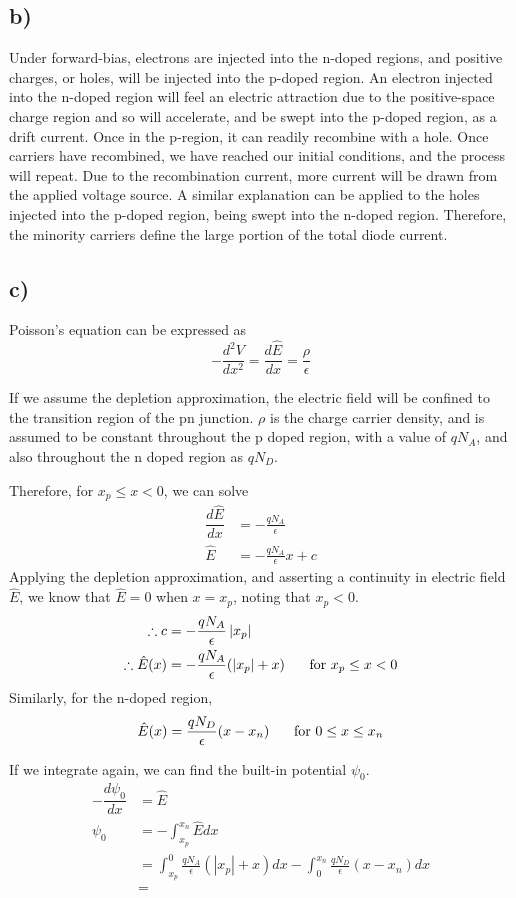 \subsection*{b)}
	Under forward-bias, electrons are injected into the n-doped regions, and positive charges, or holes, 
	will be injected into the p-doped region. An electron injected into the n-doped region will feel an electric attraction due to the positive-space charge region and so will accelerate, and be swept into the p-doped region, as a drift current. Once in the p-region, it can readily recombine with a hole. Once carriers have recombined, we have reached our initial conditions, and the process will repeat. Due to the recombination current, more current will be drawn from the applied voltage source. A similar explanation can be applied to the holes injected into the p-doped region, being swept into the n-doped region. Therefore, the minority carriers define the large portion of the total diode current.
\subsection*{c)}
	Poisson's equation can be expressed as
	$$-\dfrac{d^2 V}{d x^2} = \dfrac{d\hat{E}}{dx} = \frac{\rho}{\epsilon} %
	$$
	
	If we assume the depletion approximation, the electric field will be confined to the transition region of the pn junction. $\rho$ is the charge carrier density, and is assumed to be constant throughout the p doped region, with a value of $q N_A$, and also throughout the n doped region as $q N_D$.
	
	Therefore, for $x_p \le x < 0$, we can solve
	\[
	\begin{aligned}
		\dfrac{d\hat{E}}{dx} &= -\frac{q N_A}{\epsilon} \\
					\hat{E}	 &= -\frac{q N_A}{\epsilon} x + c
	\end{aligned}
	\]
	Applying the depletion approximation, and asserting a continuity in electric field $\hat{E}$, we know that $\hat{E} = 0$ when $x = x_p$, noting that $x_p < 0$.
	\[
	\begin{aligned}
		\therefore c &= - \dfrac{q N_A}{\epsilon}\left|x_p\right| \\
		\therefore \hat{E}(x) &= - \dfrac{q N_A}{\epsilon}(\left|x_p\right| + x) \textrm{\hspace{0.5cm} for } x_p \le x < 0
	\end{aligned}
	\]
	Similarly, for the n-doped region,
	$$ \hat{E}(x) = \dfrac{q N_D}{\epsilon}(x -x_n) \textrm{\hspace{0.5cm} for } 0 \le x \le x_n$$
	
	If we integrate again, we can find the built-in potential $\psi_0$.
	\[
	\begin{aligned}
		- \dfrac{d \psi_0}{dx} &= \hat{E} \\
		\psi_0 &= - \int_{x_p}^{x_n} \hat{E} dx \\
			   &= 
			   \int_{x_p}^{0} \frac{q N_A}{\epsilon} (\left|x_p\right|+x) dx 
			   - \int_{0}^{x_n} \frac{q N_D}{\epsilon} (x - x_n) dx \\
			   &= 
	\end{aligned}
	\]
